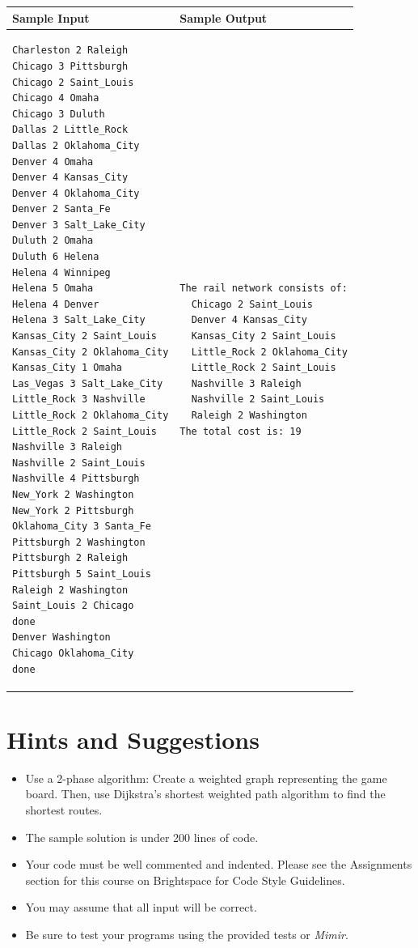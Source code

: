 \documentclass[12pt,pdftex]{article}
\begin{document}
\begin{tabular}{l|l}
{\bf Sample Input } & {\bf Sample Output} \\
\hline
\begin{minipage}[t]{0.5\linewidth}
\vspace*{0.5ex}
\begin{verbatim}
Charleston 2 Raleigh
Chicago 3 Pittsburgh
Chicago 2 Saint_Louis
Chicago 4 Omaha
Chicago 3 Duluth
Dallas 2 Little_Rock
Dallas 2 Oklahoma_City
Denver 4 Omaha
Denver 4 Kansas_City
Denver 4 Oklahoma_City
Denver 2 Santa_Fe
Denver 3 Salt_Lake_City
Duluth 2 Omaha
Duluth 6 Helena
Helena 4 Winnipeg
Helena 5 Omaha
Helena 4 Denver
Helena 3 Salt_Lake_City
Kansas_City 2 Saint_Louis
Kansas_City 2 Oklahoma_City
Kansas_City 1 Omaha
Las_Vegas 3 Salt_Lake_City
Little_Rock 3 Nashville
Little_Rock 2 Oklahoma_City
Little_Rock 2 Saint_Louis
Nashville 3 Raleigh
Nashville 2 Saint_Louis
Nashville 4 Pittsburgh
New_York 2 Washington
New_York 2 Pittsburgh
Oklahoma_City 3 Santa_Fe
Pittsburgh 2 Washington
Pittsburgh 2 Raleigh
Pittsburgh 5 Saint_Louis
Raleigh 2 Washington
Saint_Louis 2 Chicago
done
Denver Washington
Chicago Oklahoma_City
done
\end{verbatim}
\vspace*{0.5ex}
\end{minipage} &
\begin{minipage}[t]{0.4\linewidth}
\vspace*{0.5ex}
\begin{verbatim}
The rail network consists of:
  Chicago 2 Saint_Louis
  Denver 4 Kansas_City
  Kansas_City 2 Saint_Louis
  Little_Rock 2 Oklahoma_City
  Little_Rock 2 Saint_Louis
  Nashville 3 Raleigh
  Nashville 2 Saint_Louis
  Raleigh 2 Washington
The total cost is: 19
\end{verbatim}
\end{minipage} \\
\end{tabular}

\section*{Hints and Suggestions}
\begin{itemize}\NoItemSpace
\item Use a 2-phase algorithm:  Create a weighted graph representing
      the game board.  Then, use Dijkstra's shortest weighted path algorithm
      to find the shortest routes.
\item The sample solution is under 200 lines of code.
\item Your code must be well commented and indented.  Please see the
      Assignments section for this course on Brightspace for Code 
      Style Guidelines.
\item You may assume that all input will be correct.  
\item Be sure to test your programs using the provided tests or {\it Mimir}.
\end{itemize}
\end{document}
